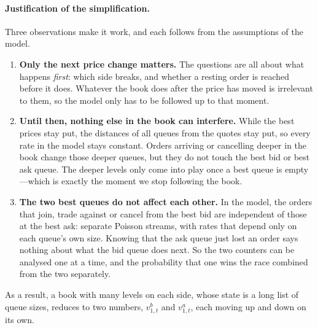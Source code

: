 \paragraph{Justification of the simplification.} Three observations make it work, and each
follows from the assumptions of the model.
\begin{enumerate}[leftmargin=1.8em,itemsep=2pt]
\item \textbf{Only the next price change matters.} The questions are all about what happens
  \emph{first}: which side breaks, and whether a resting order is reached before it does. Whatever the
  book does after the price has moved is irrelevant to them, so the model only has to be followed up to
  that moment.
\item \textbf{Until then, nothing else in the book can interfere.} While the best prices stay put, the
  distances of all queues from the quotes stay put, so every rate in the model stays constant. Orders
  arriving or cancelling deeper in the book change those deeper queues, but they do not touch the best
  bid or best ask queue. The deeper levels only come into play once a best queue is empty---which is
  exactly the moment we stop following the book.
\item \textbf{The two best queues do not affect each other.} In the model, the orders that join, trade
  against or cancel from the best bid are independent of those at the best ask: separate Poisson
  streams, with rates that depend only on each queue's own size. Knowing that the ask queue just lost
  an order says nothing about what the bid queue does next. So the two counters can be analysed one at a
  time, and the probability that one wins the race combined from the two separately.
\end{enumerate}
As a result, a book with many levels on each side, whose state is a long list of queue sizes,
reduces to two numbers, $v^b_{1,t}$ and $v^a_{1,t}$, each moving up and down on its own.

